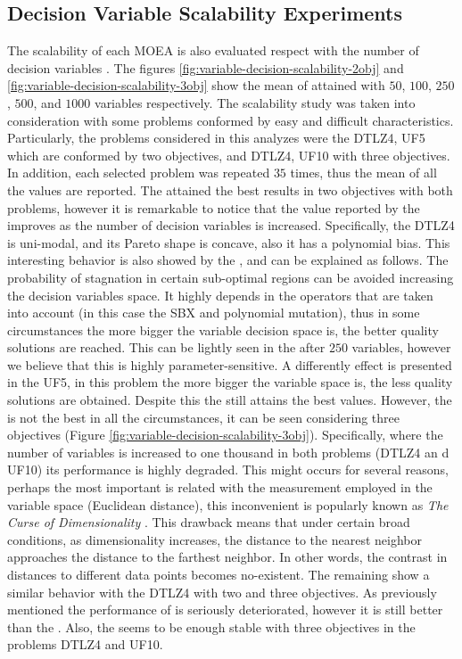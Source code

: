 \subsection{Decision Variable Scalability Experiments}

 
The scalability of each MOEA is also evaluated respect with the number of decision variables \cite{Joel:ScalabilityStudy}. 
%
The figures \ref{fig:variable-decision-scalability-2obj} and \ref{fig:variable-decision-scalability-3obj} show the mean of \HV{} attained with $50$, $100$, $250$, $500$, and $1000$ variables respectively.
%
The scalability study was taken into consideration with some problems conformed by easy and difficult characteristics.
%
Particularly, the problems considered in this analyzes were the DTLZ4, UF5 which are conformed by two objectives, and DTLZ4, UF10 with three objectives.
%
In addition, each selected problem was repeated $35$ times, thus the mean of all the \HV{} values are reported.
%
The \VSDMOEA{} attained the best results in two objectives with both problems, however it is remarkable to notice that the \HV{} value reported by the \NSGAII{} improves as the number of decision variables is increased.
%
Specifically, the DTLZ4 is uni-modal, and its Pareto shape is concave, also it has a polynomial bias.
%
This interesting behavior is also showed by the \RMOEA{}, and can be explained as follows.
%
The probability of stagnation in certain sub-optimal regions can be avoided increasing the decision variables space.
%
It highly depends in the operators that are taken into account (in this case the SBX and polynomial mutation), thus in some circumstances the more bigger the variable decision space is, the better quality solutions are reached.
%
This can be lightly seen in the \MOEAD{} after $250$ variables, however we believe that this \MOEA{} is highly parameter-sensitive.
%
A differently effect is presented in the UF5, in this problem the more bigger the variable space is, the less quality solutions are obtained.
%
Despite this the \VSDMOEA{} still attains the best \HV{} values.
%
However, the \VSDMOEA{} is not the best \MOEA{} in all the circumstances, it can be seen considering three objectives (Figure \ref{fig:variable-decision-scalability-3obj}).
%
Specifically, where the number of variables is increased to one thousand in both problems (DTLZ4 an d UF10) its performance is highly degraded.
%
This might occurs for several reasons, perhaps the most important is related with the measurement employed in the variable space (Euclidean distance), this inconvenient is popularly known as \textit{The Curse of Dimensionality} \cite{trunk1979problem, beyer1999nearest}.
%
This drawback means that under certain broad conditions, as dimensionality increases, the distance to the nearest neighbor approaches the distance to the farthest neighbor.
%
In other words, the contrast in distances to different data points becomes no-existent.
%
The remaining \MOEAS{} show a similar behavior with the DTLZ4 with two and three objectives.
%
As previously mentioned the performance of \VSDMOEA{} is seriously deteriorated, however it is still better than the \NSGAII{}.
%
Also, the \RMOEA{} seems to be enough stable with three objectives in the problems DTLZ4 and UF10.


